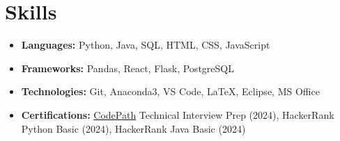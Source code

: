 \documentclass[letterpaper,11pt]{article}
\makeatletter
\newcommand{\resumeItem}[1]{
  \item\small{
    {#1 \vspace{-3pt}}
  }
}
\newcommand{\resumeSubheading}[4]{
  \vspace{-2pt}\item
    \begin{tabular*}{0.97\textwidth}[t]{l@{\extracolsep{\fill}}r@{\hspace{-0.2in}}}
        \textbf{#1} & #2 \\
        \textit{\small#3} & \textit{\small #4} \\
    \end{tabular*}\vspace{-1pt}
}
\newcommand{\resumeSubHeadingListStart}{\begin{itemize}[leftmargin=0.00in, rightmargin=-0.2in, label={}]}
\newcommand{\resumeItemListStart}{\begin{itemize}[leftmargin=0.15in, rightmargin=0.15in]}
\newcommand{\resumeItemListEnd}{\end{itemize}\vspace{-7pt}}
\makeatother
\begin{document}
\section{Skills}
    \vspace*{3pt}
    \begin{itemize}[itemsep=-0.05in, leftmargin=0.05in, label={}]
        \item \small{
            \textbf{Languages: } Python, Java, SQL, HTML, CSS, JavaScript
        }
        \item \small{
            \textbf{Frameworks: } Pandas, React, Flask, PostgreSQL
        }
        \item \small{
            \textbf{Technologies: } Git, Anaconda3, VS Code, LaTeX, Eclipse, MS Office
        }
        \item \small{
            \textbf{Certifications: } \href{https://www.codepath.org/}{\underline{CodePath}} Technical Interview Prep (2024), HackerRank Python Basic (2024), HackerRank Java Basic (2024)
        }
    \end{itemize}



\end{document}
